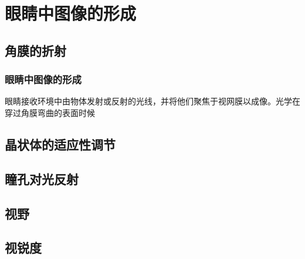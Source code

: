 \section{眼睛中图像的形成}
\subsection{角膜的折射}
\begin{frame}
    \frametitle{眼睛中图像的形成}

    眼睛接收环境中由物体发射或反射的光线，并将他们聚焦于视网膜以成像。光学在穿过角膜弯曲的表面时候
    

\end{frame}
\subsection{晶状体的适应性调节}
\subsection{瞳孔对光反射}
\subsection{视野}
\subsection{视锐度}
